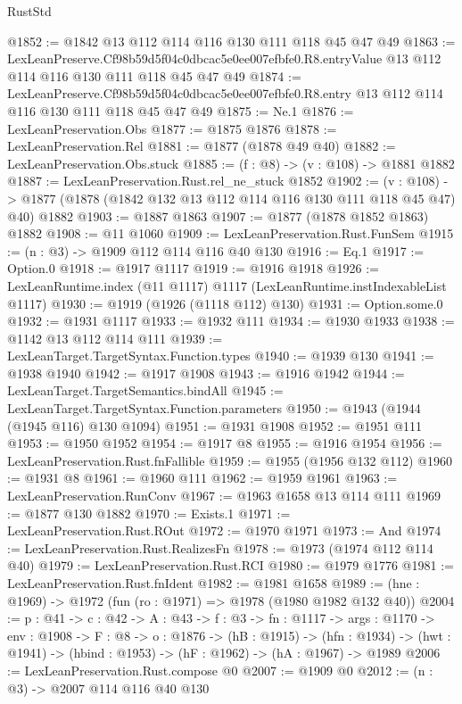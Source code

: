 \begin{lexlean}{RustStd}
\begin{coremodule}
@1852 := @1842 @13 @112 @114 @116 @130 @111 @118 @45 @47 @49
@1863 := LexLeanPreserve.Cf98b59d5f04c0dbcac5e0ee007efbfe0.R8.entryValue
    @13
    @112
    @114
    @116
    @130
    @111
    @118
    @45
    @47
    @49
@1874 := LexLeanPreserve.Cf98b59d5f04c0dbcac5e0ee007efbfe0.R8.entry
    @13
    @112
    @114
    @116
    @130
    @111
    @118
    @45
    @47
    @49
@1875 := Ne.{1}
@1876 := LexLeanPreservation.Obs
@1877 := @1875 @1876
@1878 := LexLeanPreservation.Rel
@1881 := @1877 (@1878 @49 @40)
@1882 := LexLeanPreservation.Obs.stuck
@1885 := (f : @8) -> (v : @108) -> @1881 @1882
@1887 := LexLeanPreservation.Rust.rel_ne_stuck @1852
@1902 := (v : @108) ->
  @1877 (@1878 (@1842 @132 @13 @112 @114 @116 @130 @111 @118 @45 @47) @40) @1882
@1903 := @1887 @1863
@1907 := @1877 (@1878 @1852 @1863) @1882
@1908 := @11 @1060
@1909 := LexLeanPreservation.Rust.FunSem
@1915 := (n : @3) -> @1909 @112 @114 @116 @40 @130
@1916 := Eq.{1}
@1917 := Option.{0}
@1918 := @1917 @1117
@1919 := @1916 @1918
@1926 := LexLeanRuntime.index (@11 @1117) @1117 (LexLeanRuntime.instIndexableList @1117)
@1930 := @1919 (@1926 (@1118 @112) @130)
@1931 := Option.some.{0}
@1932 := @1931 @1117
@1933 := @1932 @111
@1934 := @1930 @1933
@1938 := @1142 @13 @112 @114 @111
@1939 := LexLeanTarget.TargetSyntax.Function.types
@1940 := @1939 @130
@1941 := @1938 @1940
@1942 := @1917 @1908
@1943 := @1916 @1942
@1944 := LexLeanTarget.TargetSemantics.bindAll
@1945 := LexLeanTarget.TargetSyntax.Function.parameters
@1950 := @1943 (@1944 (@1945 @116) @130 @1094)
@1951 := @1931 @1908
@1952 := @1951 @111
@1953 := @1950 @1952
@1954 := @1917 @8
@1955 := @1916 @1954
@1956 := LexLeanPreservation.Rust.fnFallible
@1959 := @1955 (@1956 @132 @112)
@1960 := @1931 @8
@1961 := @1960 @111
@1962 := @1959 @1961
@1963 := LexLeanPreservation.RunConv
@1967 := @1963 @1658 @13 @114 @111
@1969 := @1877 @130 @1882
@1970 := Exists.{1}
@1971 := LexLeanPreservation.Rust.ROut
@1972 := @1970 @1971
@1973 := And
@1974 := LexLeanPreservation.Rust.RealizesFn
@1978 := @1973 (@1974 @112 @114 @40)
@1979 := LexLeanPreservation.Rust.RCI
@1980 := @1979 @1776
@1981 := LexLeanPreservation.Rust.fnIdent
@1982 := @1981 @1658
@1989 := (hne : @1969) -> @1972 (fun (ro : @1971) => @1978 (@1980 @1982 @132 @40))
@2004 := {p : @41} ->
  {c : @42} ->
  {A : @43} ->
  {f : @3} ->
  {fn : @1117} ->
  {args : @1170} ->
  {env : @1908} ->
  {F : @8} ->
  {o : @1876} ->
  (hB : @1915) ->
  (hfn : @1934) -> (hwt : @1941) -> (hbind : @1953) -> (hF : @1962) -> (hA : @1967) -> @1989
@2006 := LexLeanPreservation.Rust.compose @0
@2007 := @1909 @0
@2012 := (n : @3) -> @2007 @114 @116 @40 @130

\end{coremodule}
\end{lexlean}
